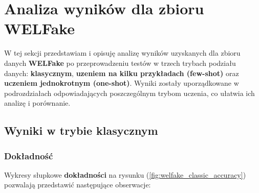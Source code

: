 \section{Analiza wyników dla zbioru \textbf{WELFake}}
W tej sekcji przedstawiam i opisuję analizę wyników uzyskanych dla zbioru danych \textbf{WELFake} po przeprowadzeniu testów w trzech trybach podziału danych: \textbf{klasycznym}, \textbf{uzeniem na kilku przykładach (few-shot)} oraz \textbf{uczeniem jednokrotnym (one-shot)}. Wyniki zostały uporządkowane w podrozdziałach odpowiadających poszczególnym trybom uczenia, co ułatwia ich analizę i porównanie.

\subsection{Wyniki w trybie klasycznym}
\subsubsection{Dokładność}
Wykresy słupkowe \textbf{dokładności} na rysunku (\ref{fig:welfake_classic_accuracy}) pozwalają przedstawić następujące obserwacje:

